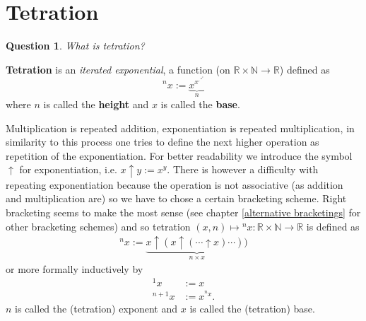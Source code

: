 \documentclass[12pt]{article}
\newtheorem{question}{Question}
\theoremstyle{definition}
\newcommand{\N}{\mathbb{N}}
\newcommand{\R}{\mathbb{R}}
\newcommand{\tothe}{\uparrow}
\newcommand{\tet}[2]{{{}^{#2}{#1}}}
\begin{document}

\section{Tetration}

\begin{question}
What is tetration?
\end{question}
{\bf Tetration} is an {\it iterated exponential}, a function (on $\R \times \N \rightarrow \R$) defined as
\begin{equation}
{}^{n}x := \underset{n}{\underbrace{x^{x^{\cdot^{\cdot^{x^x}}}}}}
\end{equation}
where $n$ is called the {\bf height} and $x$ is called the {\bf base}. 

Multiplication is repeated addition, exponentiation is repeated
multiplication, in similarity to this process one tries to define the
next higher operation as repetition of the exponentiation. For better
readability we introduce the symbol $\uparrow$ for exponentiation,
i.e. $x\uparrow y:=x^y$. There is however a difficulty with repeating
exponentiation because the operation is not associative (as addition
and multiplication are) so we have to chose a certain bracketing
scheme. Right bracketing seems to make the most sense (see chapter
\ref{alternative bracketings} for other bracketing schemes) and so
tetration $(x,n)\mapsto \tet{x}{n}\colon \R\times\N\to \R$ is defined as
\begin{align*}
  \tet{x}{n} := \underbrace{x\tothe (x \tothe( \dotsb \tothe x)\dotsb))}_{n\times x}
\end{align*}
or more formally inductively by
\begin{align}
  \tet{x}{1} &:= x\label{tetration start}\\
  \tet{x}{n+1} &:= x^{\tet{x}{n}}\label{tetration step}.
\end{align}
$n$ is called the (tetration) exponent and $x$ is called the
(tetration) base. 
\end{document}
